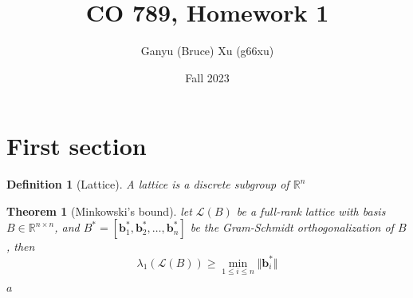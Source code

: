 \documentclass{article}
\title{CO 789, Homework 1}
\author{Ganyu (Bruce) Xu (g66xu)}
\date{Fall 2023}
\newcommand{\norm}[1]{\Vert {#1} \Vert}
\newtheorem{definition}{Definition}[section]
\newtheorem{theorem}{Theorem}[section]
\begin{document}
\maketitle

\section{First section}
\begin{definition}[Lattice]\label{lattice-def}
A lattice is a discrete subgroup of $\mathbb{R}^n$
\end{definition}

\begin{theorem}[Minkowski's bound]
    let $\mathcal{L}(B)$ be a full-rank lattice with basis $B \in \mathbb{R}^{n \times n}$, and $B^\ast = [\mathbf{b}_1^\ast, \mathbf{b}_2^\ast, \ldots, \mathbf{b}_n^\ast]$ be the Gram-Schmidt orthogonalization of $B$, then
    \begin{equation}
        \lambda_1(\mathcal{L}(B)) \geq \min_{1 \leq i \leq n}\norm{\mathbf{b}_i^\ast}
    \end{equation}
\end{theorem}

\begin{algorithm}
    \SetAlgoLined
    \caption{Euclid's algorithm}
    \Return $a$\;
\end{algorithm}
\end{document}
